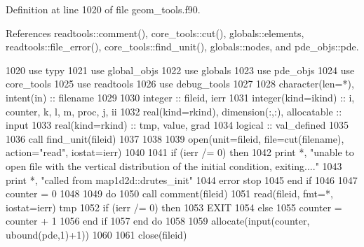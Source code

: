 Definition at line 1020 of file geom\+\_\+tools.\+f90.



References readtools\+::comment(), core\+\_\+tools\+::cut(), globals\+::elements, readtools\+::file\+\_\+error(), core\+\_\+tools\+::find\+\_\+unit(), globals\+::nodes, and pde\+\_\+objs\+::pde.


\begin{DoxyCode}
1020       \textcolor{keywordtype}{use }typy
1021       \textcolor{keywordtype}{use }global_objs
1022       \textcolor{keywordtype}{use }globals
1023       \textcolor{keywordtype}{use }pde_objs
1024       \textcolor{keywordtype}{use }core_tools
1025       \textcolor{keywordtype}{use }readtools
1026       \textcolor{keywordtype}{use }debug_tools
1027       
1028       \textcolor{keywordtype}{character(len=*)}, \textcolor{keywordtype}{intent(in)} :: filename
1029       
1030       \textcolor{keywordtype}{integer} :: fileid, ierr
1031       \textcolor{keywordtype}{integer(kind=ikind)} :: i, counter, k, l, m, proc, j, ii
1032       \textcolor{keywordtype}{real(kind=rkind)}, \textcolor{keywordtype}{dimension(:,:)}, \textcolor{keywordtype}{allocatable} :: input
1033       \textcolor{keywordtype}{real(kind=rkind)} :: tmp, \textcolor{keywordtype}{value}, grad
1034       \textcolor{keywordtype}{logical} :: val\_defined
1035       
1036       \textcolor{keyword}{call }find_unit(fileid)
1037       
1038       
1039       \textcolor{keyword}{open}(unit=fileid, file=cut(filename), action=\textcolor{stringliteral}{"read"}, iostat=ierr)
1040       
1041       \textcolor{keywordflow}{if} (ierr /= 0) \textcolor{keywordflow}{then}
1042         print *, \textcolor{stringliteral}{"unable to open file with the vertical distribution of the initial condition, exiting...."}
1043         print *, \textcolor{stringliteral}{"called from map1d2d::drutes\_init"}
1044         error stop
1045 \textcolor{keywordflow}{      end if}
1046       
1047       counter = 0
1048       
1049       \textcolor{keywordflow}{do}
1050         \textcolor{keyword}{call }comment(fileid)
1051         \textcolor{keyword}{read}(fileid, fmt=*, iostat=ierr) tmp
1052         \textcolor{keywordflow}{if} (ierr /= 0) \textcolor{keywordflow}{then}
1053           \textcolor{keywordflow}{EXIT}
1054         \textcolor{keywordflow}{else}
1055           counter = counter + 1
1056 \textcolor{keywordflow}{        end if}
1057 \textcolor{keywordflow}{      end do}
1058       
1059       \textcolor{keyword}{allocate}(input(counter, ubound(pde,1)+1))
1060       
1061       \textcolor{keyword}{close}(fileid)

\end{DoxyCode}
